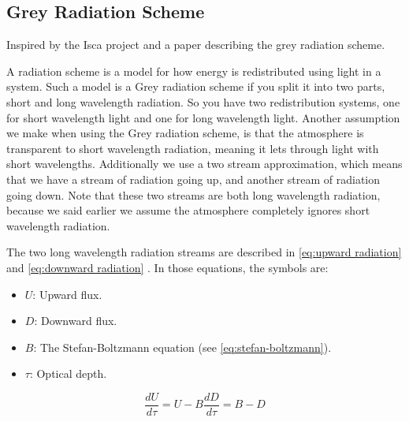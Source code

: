 \subsection{Grey Radiation Scheme}
Inspired by the Isca project \cite{isca} and a paper describing the grey radiation scheme\cite{greyRad}.

A radiation scheme is a model for how energy is redistributed using light in a system. Such a model is a Grey radiation scheme if you split it into two parts, short and long wavelength radiation.
So you have two redistribution systems, one for short wavelength light and one for long wavelength light. Another assumption we make when using the Grey radiation scheme, is that the atmosphere 
is transparent to short wavelength radiation, meaning it lets through light with short wavelengths. Additionally we use a two stream approximation, which means that we have a stream of radiation
going up, and another stream of radiation going down. Note that these two streams are both long wavelength radiation, because we said earlier we assume the atmosphere completely ignores short 
wavelength radiation.

The two long wavelength radiation streams are described in \autoref{eq:upward radiation} and \autoref{eq:downward radiation} \cite{greyRad}. In those equations, the symbols are:

\begin{itemize}
    \item $U$: Upward flux.
    \item $D$: Downward flux.
    \item $B$: The Stefan-Boltzmann equation (see \autoref{eq:stefan-boltzmann}).
    \item $\tau$: Optical depth.
\end{itemize}

\begin{subequations}
    \begin{equation}
        \frac{dU}{d\tau} = U - B
        \label{eq:upward radiation}
    \end{equation}
    \begin{equation}
        \frac{dD}{d\tau} = B - D
        \label{eq:downward radiation}
    \end{equation}
\end{subequations}

